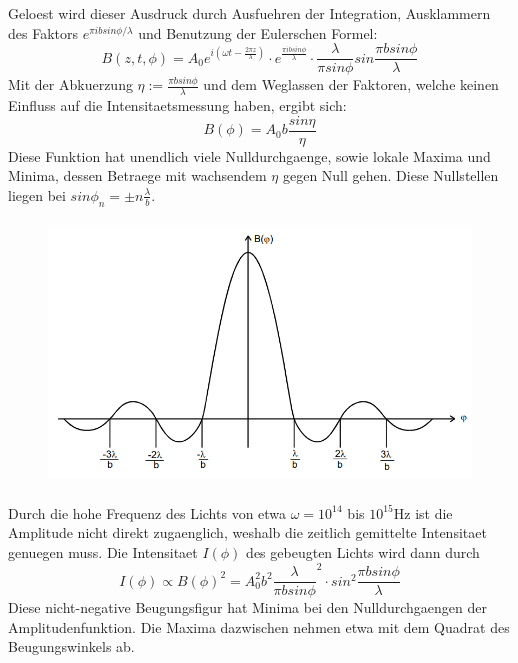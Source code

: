 Geloest wird dieser Ausdruck durch Ausfuehren der Integration, Ausklammern des Faktors $e^{\pi ibsin\phi/\lambda}$ und Benutzung der Eulerschen Formel:
\begin{equation*}
    B(z, t, \phi)=A_0e^{i(\omega t-\frac{2\pi z}{\lambda})}\cdot e^{\frac{\pi ibsin\phi}{\lambda}}\cdot\frac{\lambda}{\pi sin\phi}sin\frac{\pi bsin\phi}{\lambda}
\end{equation*}
Mit der Abkuerzung $\eta:=\frac{\pi bsin\phi}{\lambda}$ und dem Weglassen der Faktoren, welche keinen Einfluss auf die Intensitaetsmessung haben, ergibt sich:
\begin{equation*}
    B(\phi)=A_0b\frac{sin\eta}{\eta}
\end{equation*}
Diese Funktion hat unendlich viele Nulldurchgaenge, sowie lokale Maxima und Minima, dessen Betraege mit wachsendem $\eta$ gegen Null gehen. Diese Nullstellen liegen bei $sin\phi_n=\pm n\frac{\lambda}{b}$.
\begin{figure}[H]
    \centering
    \captionsetup{justification=centering}
    \includegraphics[height=7cm]{"Amplitude_BeugungSpalt.png"}
    \label{Fig:Amplitude}
\end{figure}
Durch die hohe Frequenz des Lichts von etwa $\omega=10^{14}$ bis $10^15$Hz ist die Amplitude nicht direkt zugaenglich, weshalb die zeitlich gemittelte Intensitaet genuegen muss. Die Intensitaet $I(\phi)$ des gebeugten Lichts wird dann durch 
\begin{equation*}
    I(\phi)\varpropto B(\phi)^2=A_0^2b^2{\frac{\lambda}{\pi bsin\phi}}^2\cdot sin^2{\frac{\pi bsin\phi}{\lambda}}
\end{equation*}
Diese nicht-negative Beugungsfigur hat Minima bei den Nulldurchgaengen der Amplitudenfunktion. Die Maxima dazwischen nehmen etwa mit dem Quadrat des Beugungswinkels ab.
